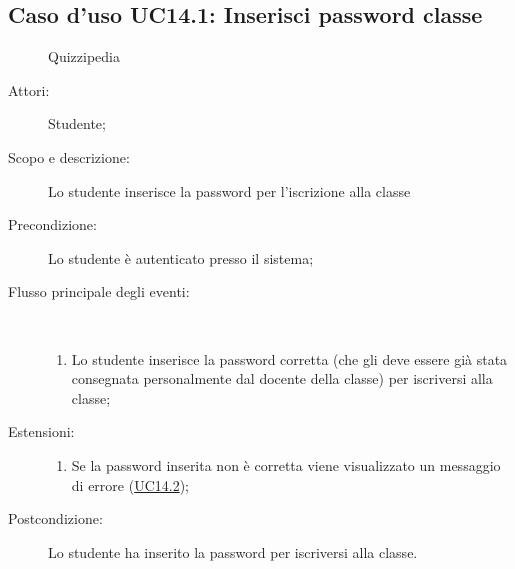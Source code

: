 \subsection{Caso d'uso UC14.1: Inserisci password classe}
	\begin{figure}[H]
		\centering
		\begin{resizedtikzpicture}{\textwidth}
		\begin{umlsystem}[x=0, fill=lightgray!20]{Quizzipedia}
		\end{umlsystem}
		\end{resizedtikzpicture}
		\caption{}
	\end{figure}
\begin{description}
\item[Attori:] Studente;
\item[Scopo e descrizione:] Lo studente inserisce la password per l'iscrizione alla classe
      \item[Precondizione:] Lo studente è autenticato presso il sistema;

        \item[Flusso principale degli eventi:] \ 
 \begin{enumerate}
          \item Lo studente inserisce la password corretta (che gli deve essere già stata consegnata personalmente dal docente della classe) per iscriversi alla classe;

      \end{enumerate}
    \item[Estensioni:]
      \begin{enumerate}
          \item Se la password inserita non è corretta viene visualizzato un messaggio di errore (\hyperlink{UC14.2}{UC14.2});

      \end{enumerate}
    \item[Postcondizione:] Lo studente ha inserito la password per iscriversi alla classe.
  \end{description}
\hypertarget{UC14.2}{}
